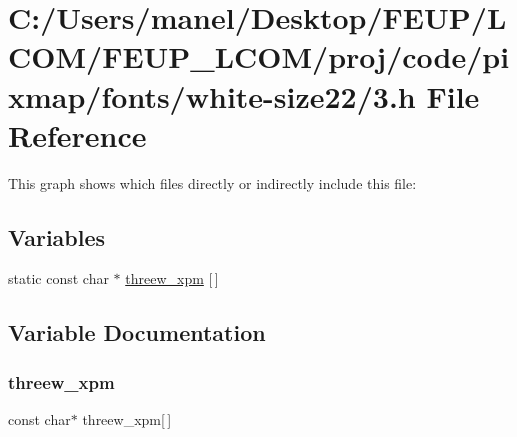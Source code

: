 \hypertarget{white-size22_23_8h}{}\section{C\+:/\+Users/manel/\+Desktop/\+F\+E\+U\+P/\+L\+C\+O\+M/\+F\+E\+U\+P\+\_\+\+L\+C\+O\+M/proj/code/pixmap/fonts/white-\/size22/3.h File Reference}
\label{white-size22_23_8h}
This graph shows which files directly or indirectly include this file\+:
\subsection*{Variables}
\begin{DoxyCompactItemize}
\item 
static const char $\ast$ \mbox{\hyperlink{white-size22_23_8h_a019386e07d53310181a93e5ade26a3df}{threew\+\_\+xpm}} \mbox{[}$\,$\mbox{]}
\end{DoxyCompactItemize}


\subsection{Variable Documentation}
\mbox{\label{white-size22_23_8h_a019386e07d53310181a93e5ade26a3df}} 
\subsubsection{\texorpdfstring{threew\_xpm}{threew\_xpm}}
{\footnotesize\ttfamily const char$\ast$ threew\+\_\+xpm\mbox{[}$\,$\mbox{]}\hspace{0.3cm}{\ttfamily [static]}}

